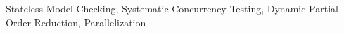 Stateless Model Checking, Systematic Concurrency Testing, Dynamic Partial Order Reduction, Parallelization